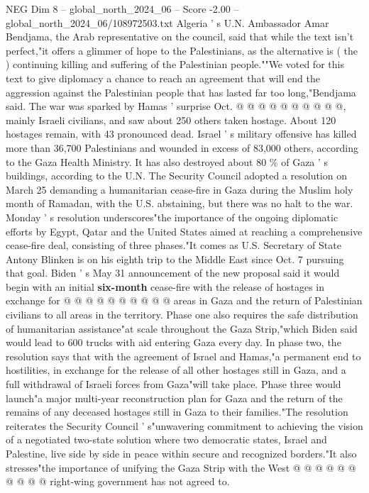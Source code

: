\begin{textsample}{NEG Dim 8 – global\_north\_2024\_06 – Score -2.00 – global\_north\_2024\_06/108972503.txt}
Algeria ' s U.N.
Ambassador Amar Bendjama, the Arab representative on the council, said that while the text isn't perfect,"it offers a glimmer of hope to the Palestinians, as the alternative is ( the ) continuing killing and suffering of the Palestinian people.""We voted for this text to give diplomacy a chance to reach an agreement that will end the aggression against the Palestinian people that has lasted far too long,"Bendjama said.
The war was sparked by Hamas ' surprise Oct. @ @ @ @ @ @ @ @ @ @, mainly Israeli civilians, and saw about 250 others taken hostage.
About 120 hostages remain, with 43 pronounced dead.
Israel ' s military offensive has killed more than 36,700 Palestinians and wounded in excess of 83,000 others, according to the Gaza Health Ministry.
It has also destroyed about 80 \% of Gaza ' s buildings, according to the U.N.
The Security Council adopted a resolution on March 25 demanding a humanitarian cease-fire in Gaza during the Muslim holy month of Ramadan, with the U.S. abstaining, but there was no halt to the war.
Monday ' s resolution underscores"the importance of the ongoing diplomatic efforts by Egypt, Qatar and the United States aimed at reaching a comprehensive cease-fire deal, consisting of three phases."It comes as U.S.
Secretary of State Antony Blinken is on his eighth trip to the Middle East since Oct. 7 pursuing that goal.
Biden ' s May 31 announcement of the new proposal said it would begin with an initial \textbf{six-month} cease-fire with the release of hostages in exchange for @ @ @ @ @ @ @ @ @ @ areas in Gaza and the return of Palestinian civilians to all areas in the territory.
Phase one also requires the safe distribution of humanitarian assistance"at scale throughout the Gaza Strip,"which Biden said would lead to 600 trucks with aid entering Gaza every day.
In phase two, the resolution says that with the agreement of Israel and Hamas,"a permanent end to hostilities, in exchange for the release of all other hostages still in Gaza, and a full withdrawal of Israeli forces from Gaza"will take place.
Phase three would launch"a major multi-year reconstruction plan for Gaza and the return of the remains of any deceased hostages still in Gaza to their families."The resolution reiterates the Security Council ' s"unwavering commitment to achieving the vision of a negotiated two-state solution where two democratic states, Israel and Palestine, live side by side in peace within secure and recognized borders."It also stresses"the importance of unifying the Gaza Strip with the West @ @ @ @ @ @ @ @ @ @ right-wing government has not agreed to.

\end{textsample}
